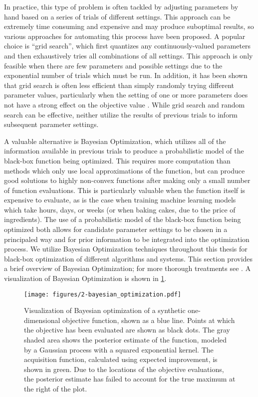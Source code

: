 In practice, this type of problem is often tackled by adjusting parameters by hand based on a series of trials of different settings.
This approach can be extremely time consuming and expensive and may produce suboptimal results, so various approaches for automating this process have been proposed.
A popular choice is ``grid search'', which first quantizes any continuously-valued parameters and then exhaustively tries all combinations of all settings.
This approach is only feasible when there are few parameters and possible settings due to the exponential number of trials which must be run.
In addition, it has been shown that grid search is often less efficient than simply randomly trying different parameter values, particularly when the setting of one or more parameters does not have a strong effect on the objective value \cite{bergstra2012random}.
While grid search and random search can be effective, neither utilize the results of previous trials to inform subsequent parameter settings.

A valuable alternative is Bayesian Optimization, which utilizes all of the information available in previous trials to produce a probabilistic model of the black-box function being optimized.
This requires more computation than methods which only use local approximations of the function, but can produce good solutions to highly non-convex functions after making only a small number of function evaluations.
This is particularly valuable when the function itself is expensive to evaluate, as is the case when training machine learning models which take hours, days, or weeks (or when baking cakes, due to the price of ingredients).
The use of a probabilistic model of the black-box function being optimized both allows for candidate parameter settings to be chosen in a principaled way and for prior information to be integrated into the optimization process.
We utilize Bayesian Optimization techniques throughout this thesis for black-box optimization of different algorithms and systems.
This section provides a brief overview of Bayesian Optimization; for more thorough treatments see \cite{brochu2010tutorial,snoek2012practical}.
A visualization of Bayesian Optimization is shown in \cref{fig:bayesian_optimization}.

\begin{figure}
  \centering
  \texttt{[image: figures/2-bayesian\_optimization.pdf]}
  \caption[Bayesian optimization of a synthetic function]{Visualization of Bayesian optimization of a synthetic one-dimensional objective function, shown as a blue line.
  Points at which the objective has been evaluated are shown as black dots.
  The gray shaded area shows the posterior estimate of the function, modeled by a Gaussian process with a squared exponential kernel.
  The acquisition function, calculated using expected improvement, is shown in green.
  Due to the locations of the objective evaluations, the posterior estimate has failed to account for the true maximum at the right of the plot.}
  \label{fig:bayesian_optimization}
\end{figure}

